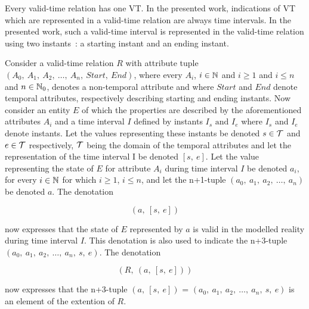 Every valid-time relation has one VT. In the presented work, indications of VT which are represented in a valid-time relation are always time intervals. In the presented work, such a valid-time interval is represented in the valid-time relation using two instants~\cite{Dyreson1994}: a starting instant and an ending instant.

Consider a valid-time relation $R$ with attribute tuple $\left(A_{0},\ A_{1},\ A_{2},\ \ldots,\ A_{n},\ Start,\ End\right)$, where every $A_{i}$, $i \in \mathbb{N}$ and $i \geq 1$ and $i \leq n$ and $n \in \mathbb{N}_{0}$, denotes a non-temporal attribute and where $Start$ and $End$ denote temporal attributes, respectively describing starting and ending instants. Now consider an entity $E$ of which the properties are described by the aforementioned attributes $A_{i}$ and a time interval $I$ defined by instants $I_{s} \text{ and } I_{e}$ where $I_{s}$ and $I_{e}$ denote instants. Let the values representing these instants be denoted $s \in \mathcal{T}$ and $e \in \mathcal{T}$ respectively, $\mathcal{T}$ being the domain of the temporal attributes and let the representation of the time interval I be denoted $\left[s,\ e\right]$. Let the value representing the state of $E$ for attribute $A_{i}$ during time interval $I$ be denoted $a_{i}$, for every $i \in \mathbb{N}$ for which $i \geq 1$, $i \leq n$, and let the n+1-tuple $\left(a_{0},\ a_{1},\ a_{2},\ \ldots,\ a_{n}\right)$ be denoted $a$. The denotation 

\begin{equation}
\label{eq:def-state}
\left(a,\ \left[s,\ e\right]\right)
\end{equation}

now expresses that the state of $E$ represented by $a$ is valid in the modelled reality during time interval $I$. This denotation is also used to indicate the n+3-tuple $\left(a_{0},\ a_{1},\ a_{2},\ \ldots,\ a_{n},\ s,\ e\right)$. The denotation

\begin{equation}
\label{eq:def-element}
\left(R,\ \left(a,\ \left[s,\ e\right]\right)\right)
\end{equation}

now expresses that the n+3-tuple $\left(a,\ \left[s,\ e\right]\right)$ = $\left(a_{0},\ a_{1},\ a_{2},\ \ldots,\ a_{n},\ s,\ e\right)$ is an element of the extention of $R$.


